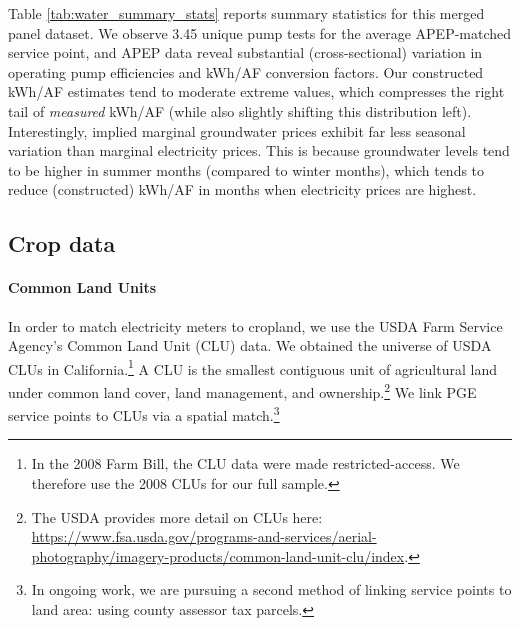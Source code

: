 Table \ref{tab:water_summary_stats} reports summary statistics for this merged panel dataset. We observe 3.45 unique pump tests for the average APEP-matched service point, and APEP data reveal substantial (cross-sectional) variation in operating pump efficiencies and kWh/AF conversion factors. Our constructed  kWh/AF estimates tend to moderate extreme values, which compresses the right tail of \emph{measured} kWh/AF (while also slightly shifting this distribution left). Interestingly, implied marginal groundwater prices exhibit far less seasonal variation than marginal electricity prices. This is because groundwater levels tend to be higher in summer months (compared to winter months), which tends to reduce (constructed) kWh/AF in months when electricity prices are highest.




\subsection{Crop data}
\paragraph{Common Land Units} 
In order to match electricity meters to cropland, we use the USDA Farm Service Agency's Common Land Unit (CLU) data. We obtained the universe of USDA CLUs in California.\footnote{In the 2008 Farm Bill, the CLU data were made restricted-access. We therefore use the 2008 CLUs for our full sample.} A CLU is the smallest contiguous unit of agricultural land under common land cover, land management, and ownership.\footnote{The USDA provides more detail on CLUs here: \url{https://www.fsa.usda.gov/programs-and-services/aerial-photography/imagery-products/common-land-unit-clu/index}.} We link PGE service points to CLUs via a spatial match.\footnote{In ongoing work, we are pursuing a second method of linking service points to land area: using county assessor tax parcels.} 

